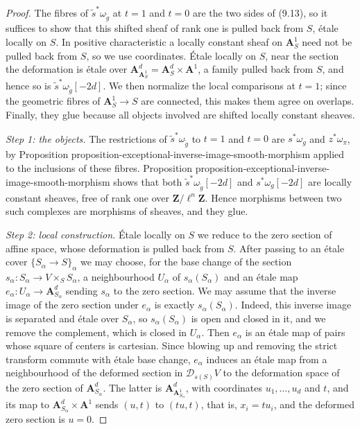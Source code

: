 \documentclass[11pt]{article}
\begin{document}
\begin{proof}[{Proof}]\label{bp28}%
The fibres of \(\widetilde s^{*}\omega_{\widetilde g}\) at \(t=1\) and \(t=0\) are the two sides of (9.13), so it suffices to show that this shifted sheaf of rank one is pulled back from \(S\), étale locally on \(S\). In positive characteristic a locally constant sheaf on \(\mathbf A^1_S\) need not be pulled back from \(S\), so we use coordinates. Étale locally on \(S\), near the section the deformation is étale over \(\mathbf A^d_{\mathbf A^1_S}=\mathbf A^d_S\times\mathbf A^1\), a family pulled back from \(S\), and hence so is \(\widetilde s^{*}\omega_{\widetilde g}[-2d]\). We then normalize the local comparisons at \(t=1\); since the geometric fibres of \(\mathbf A^1_S\to S\) are connected, this makes them agree on overlaps. Finally, they glue because all objects involved are shifted locally constant sheaves.

\emph{Step 1: the objects.} The restrictions of \(\widetilde s^{*}\omega_{\widetilde g}\) to \(t=1\) and \(t=0\) are \(s^{*}\omega_{g}\) and \(z^{*}\omega_{\pi}\), by Proposition proposition-exceptional-inverse-image-smooth-morphism applied to the inclusions of these fibres. Proposition proposition-exceptional-inverse-image-smooth-morphism shows that both \(\widetilde s^{*}\omega_{\widetilde g}[-2d]\) and \(s^{*}\omega_{g}[-2d]\) are locally constant sheaves, free of rank one over \(\mathbf Z/\ell^n\mathbf Z\). Hence morphisms between two such complexes are morphisms of sheaves, and they glue.

\emph{Step 2: local construction.} Étale locally on \(S\) we reduce to the zero section of affine space, whose deformation is pulled back from \(S\). After passing to an étale cover \(\{S_\alpha\to S\}_\alpha\) we may choose, for the base change of the section \(s_\alpha:S_\alpha\to V\times_SS_\alpha\), a neighbourhood \(U_\alpha\) of \(s_\alpha(S_\alpha)\) and an étale map \(e_\alpha:U_\alpha\to\mathbf A^d_{S_\alpha}\) sending \(s_\alpha\) to the zero section. We may assume that the inverse image of the zero section under \(e_\alpha\) is exactly \(s_\alpha(S_\alpha)\). Indeed, this inverse image is separated and étale over \(S_\alpha\), so \(s_\alpha(S_\alpha)\) is open and closed in it, and we remove the complement, which is closed in \(U_\alpha\). Then \(e_\alpha\) is an étale map of pairs whose square of centers is cartesian. Since blowing up and removing the strict transform commute with étale base change, \(e_\alpha\) induces an étale map from a neighbourhood of the deformed section in \(\mathcal D_{s(S)}V\) to the deformation space of the zero section of \(\mathbf A^d_{S_\alpha}\). The latter is \(\mathbf A^d_{\mathbf A^1_{S_\alpha}}\), with coordinates \(u_1,\ldots,u_d\) and \(t\), and its map to \(\mathbf A^d_{S_\alpha}\times\mathbf A^1\) sends \((u,t)\) to \((tu,t)\), that is, \(x_i=tu_i\), and the deformed zero section is \(u=0\).


\end{proof}
\end{document}
